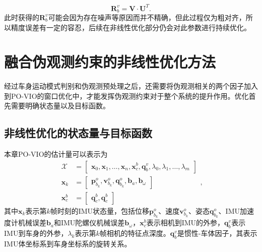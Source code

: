 \begin{equation}
  \symbf{R}_{b}^{v} = \symbf{V} \cdot \symbf{U}^T.
\end{equation}
此时获得的$\symbf{R}_{b}^{v}$可能会因为存在噪声等原因而并不精确，但此过程仅为粗对齐，所以精度误差有一定的容忍，后续在非线性优化部分仍会对此参数进行持续优化。

\section{融合伪观测约束的非线性优化方法}
经过车身运动模式判别和伪观测预处理之后，还需要将伪观测相关的两个因子加入到PO-VIO的窗口优化中，才能发挥伪观测约束对于整个系统的提升作用。优化首先需要明确状态量以及目标函数。

\subsection{非线性优化的状态量与目标函数}

本章PO-VIO的估计量可以表示为
\begin{equation}
\begin{aligned}
  \mathcal{X} &= \begin{bmatrix} \symbf{x}_0, \symbf{x}_1, \dots, \symbf{x}_n, \symbf{x}_c^b, \symbf{q}_b^v, \lambda_0, \lambda_1, \dots, \lambda_m \end{bmatrix} \\
  \symbf{x}_k &= \begin{bmatrix} \symbf{p}_{b_{k}}^o, \symbf{v}_{b_{k}}^o, \symbf{q}_{b_{k}}^o, \symbf{b}_a, \symbf{b}_{\omega} \end{bmatrix} \\
  \symbf{x}_c^b &= \begin{bmatrix} \symbf{q}_{c}^b, \symbf{q}_{c}^b \end{bmatrix}
\end{aligned},
\end{equation}
其中$\symbf{x}_k$表示第$k$帧时刻的IMU状态量，包括位移$\symbf{p}_{b_{k}}^o$、速度$\symbf{v}_{b_{k}}^o$、姿态$\symbf{q}_{b_{k}}^o$、IMU加速度计机械误差$\symbf{b}_a$和IMU陀螺仪机械误差$\symbf{b}_{\omega}$，$\symbf{x}_c^b$表示相机到IMU的外参，$\symbf{q}_b^v$表示IMU到车身的外参，$\lambda_k$表示第$k$帧相机的特征点深度。$\symbf{q}_b^v$是惯性-车体因子，其表示IMU体坐标系到车身坐标系的旋转关系。

